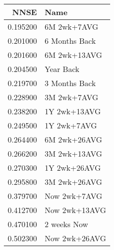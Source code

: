 \begin{tabular}{rl}
NNSE & Name \\
\hline
0.195200 & 6M 2wk+7AVG \\
0.201000 & 6 Months Back \\
0.201600 & 6M 2wk+13AVG \\
0.204500 & Year Back \\
0.219700 & 3 Months Back \\
0.228900 & 3M 2wk+7AVG \\
0.238200 & 1Y 2wk+13AVG \\
0.249500 & 1Y 2wk+7AVG \\
0.264400 & 6M 2wk+26AVG \\
0.266200 & 3M 2wk+13AVG \\
0.270300 & 1Y 2wk+26AVG \\
0.295800 & 3M 2wk+26AVG \\
0.379700 & Now 2wk+7AVG \\
0.412700 & Now 2wk+13AVG \\
0.470100 & 2 weeks Now \\
0.502300 & Now 2wk+26AVG \\
\hline
\end{tabular}